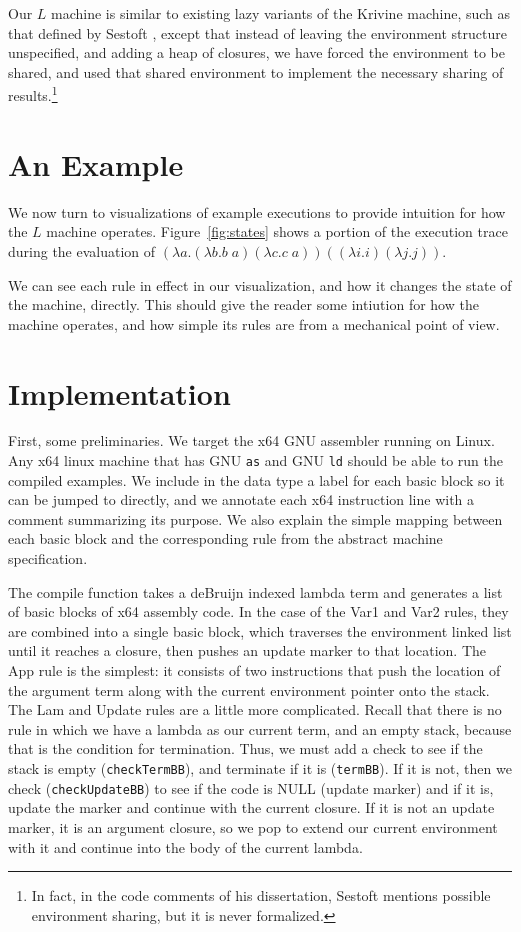 \documentclass[preprint]{sigplanconf}
\begin{document}
Our $L$ machine is similar to existing lazy variants of the Krivine machine,
such as that defined by Sestoft \cite{sestoft}, except that instead of leaving
the environment structure unspecified, and adding a heap of closures, we have
forced the environment to be shared, and used that shared environment to
implement the necessary sharing of results.\footnote{In fact, in the code
comments of his dissertation, Sestoft mentions possible environment sharing, but
it is never formalized.} 

\section{An Example}

We now turn to visualizations of example executions to provide intuition for how
the $L$ machine operates. Figure~\ref{fig:states} shows a portion of the
execution trace during the evaluation of $(\lambda a.(\lambda b.b \; a) (\lambda
c.c \; a)) ((\lambda i.i) (\lambda j.j))$. 



We can see each rule in effect in our visualization, and how it changes the
state of the machine, directly. This should give the reader some intiution for
how the machine operates, and how simple its rules are from a mechanical point
of view. 

\section{Implementation}\label{sec:impl}

First, some preliminaries. We target the x64 GNU assembler running on
Linux. Any x64 linux machine that has GNU \texttt{as} and GNU \texttt{ld} should
be able to run the compiled examples.  We include in the data type a label for
each basic block so it can be jumped to directly, and we annotate each x64
instruction line with a comment summarizing its purpose.  We also explain the
simple mapping between each basic block and the corresponding rule from the
abstract machine specification.

The compile function takes a deBruijn indexed lambda term and
generates a list of basic blocks of x64 assembly code. In the case of the Var1
and Var2 rules, they are combined into a single basic block, which traverses the
environment linked list until it reaches a closure, then pushes an update marker
to that location. The App rule is the simplest: it consists of two instructions
that push the location of the argument term along with the current environment
pointer onto the stack. The Lam and Update rules are a little more complicated.
Recall that there is no rule in which we have a lambda as our current term, and
an empty stack, because that is the condition for termination. Thus, we
must add a check to see if the stack is empty (\texttt{checkTermBB}), and terminate if it
is (\texttt{termBB}). If it is not, then we check (\texttt{checkUpdateBB}) to
see if the code is NULL (update marker) and if it is, update the marker and
continue with the current closure. If it is not an update marker, it is an
argument closure, so we pop to extend our current environment with it and
continue into the body of the current lambda.
\end{document}
